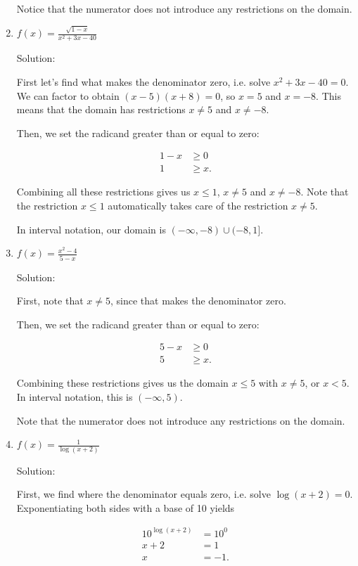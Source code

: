 \documentclass{ximera}
\begin{document}
\begin{enumerate}
\begin{expandable}
Notice that the numerator does not introduce any restrictions on the domain. 
		\end{expandable}
	\item $f(x) = \frac{\sqrt{1-x}}{x^2 + 3x - 40}$
		\begin{expandable}
			Solution:

First let's find what makes the denominator zero, i.e. solve $x^2 + 3x - 40 = 0$. We can factor to obtain $(x - 5)(x + 8) = 0$, so $x = 5$ and $x = -8$. This means that the domain has restrictions $x \ne 5$ and $x \ne -8$. 

Then, we set the radicand greater than or equal to zero:

\begin{align*}1 - x&\ge 0 \\ 1 & \ge x. \end{align*}

Combining all these restrictions gives us $x \le 1$, $x \ne 5$ and $x \ne -8$. Note that the restriction $x \le 1$ automatically takes care of the restriction $x \ne 5$. 

In interval notation, our domain is $(- \infty, -8) \cup (-8, 1]$. 
		\end{expandable}
	\item $f(x) = \frac{x^2 - 4}{5 - x}$
		\begin{expandable}
			Solution:

First, note that $x \ne 5$, since that makes the denominator zero.

Then, we set the radicand greater than or equal to zero:

\begin{align*}5 - x&\ge 0 \\ 5 & \ge x. \end{align*}

Combining these restrictions gives us the domain $x \le 5$ with $x \ne 5$, or $x < 5$. In interval notation, this is $(-\infty, 5)$.

Note that the numerator does not introduce any restrictions on the domain. 

		\end{expandable}
	\item $f(x) = \frac{1}{\log(x + 2)}$
		\begin{expandable}
			Solution:

First, we find where the denominator equals zero, i.e. solve $\log(x + 2) = 0$. Exponentiating both sides with a base of 10 yields

\begin{align*}10^{\log(x + 2)} & = 10^0 \\ x + 2 & = 1 \\ x & = -1. \end{align*}


\end{expandable}
\end{enumerate}
\end{document}
